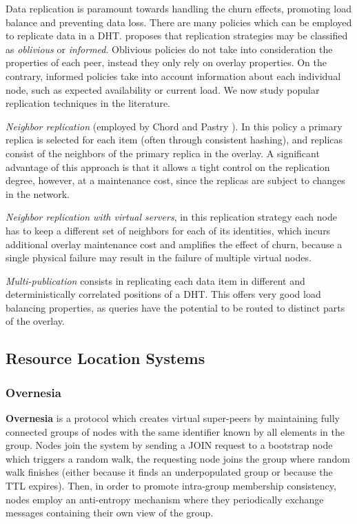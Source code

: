Data replication is paramount towards handling the churn effects, promoting load balance and preventing data loss. There are many policies which can be employed to replicate data in a DHT. \textcite{Policies_for_Efficient_Data_Replication_in_P2P_Systems} proposes that replication strategies may be classified as \textit{oblivious} or \textit{informed}. Oblivious policies do not take into consideration the properties of each peer, instead they only rely on overlay properties. On the contrary, informed policies take into account information about each individual node, such as expected availability or current load. We now study popular replication techniques in the literature.

\textit{Neighbor replication} (employed by Chord \cite{stoica2003chord} and Pastry \cite{rowstron2001pastry}). In this policy a primary replica is selected for each item (often through consistent hashing), and replicas consist of the neighbors of the primary replica in the overlay. A significant advantage of this approach is that it allows a tight control on the replication degree, however, at a maintenance cost, since the replicas are subject to changes in the network.

\textit{Neighbor replication with virtual servers}, in this replication strategy each node has to keep a different set of neighbors for each of its identities, which incurs additional overlay maintenance cost and amplifies the effect of churn, because a single physical failure may result in the failure of multiple virtual nodes. 

\textit{Multi-publication} consists in replicating each data item in different and deterministically correlated positions of a DHT. This offers very good load balancing properties, as queries have the potential to be routed to distinct parts of the overlay.


\subsection{Resource Location Systems}

\subsubsection*{Overnesia}

\textbf{Overnesia} \cite{leitao2014overnesia} is a protocol which creates virtual super-peers by maintaining fully connected groups of nodes with the same identifier known by all elements in the group. Nodes join the system by sending a JOIN request to a bootstrap node which triggers a random walk, the requesting node joins the group where random walk finishes (either because it finds an underpopulated group or because the TTL expires). Then, in order to promote intra-group membership consistency, nodes employ an anti-entropy mechanism where they periodically exchange messages containing their own view of the group. 

